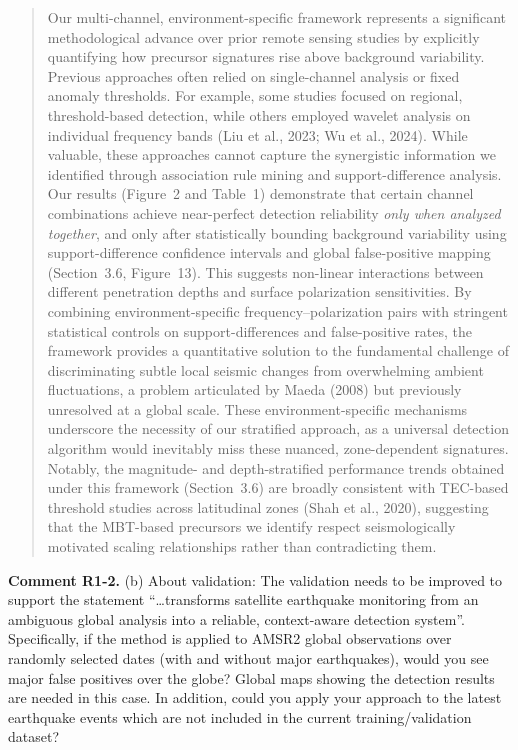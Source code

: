 \documentclass[12pt]{article}
\newcommand{\revcomment}[1]{\begingroup\color{commentcolor}#1\endgroup}
\begin{document}
{\begin{quote}
Our multi-channel, environment-specific framework represents a significant methodological advance over prior remote sensing studies by explicitly quantifying how precursor signatures rise above background variability. Previous approaches often relied on single-channel analysis or fixed anomaly thresholds. For example, some studies focused on regional, threshold-based detection, while others employed wavelet analysis on individual frequency bands (Liu et al., 2023; Wu et al., 2024). While valuable, these approaches cannot capture the synergistic information we identified through association rule mining and support-difference analysis. Our results (Figure~2 and Table~1) demonstrate that certain channel combinations achieve near-perfect detection reliability \emph{only when analyzed together}, and only after statistically bounding background variability using support-difference confidence intervals and global false-positive mapping (Section~3.6, Figure~13). This suggests non-linear interactions between different penetration depths and surface polarization sensitivities. By combining environment-specific frequency--polarization pairs with stringent statistical controls on support-differences and false-positive rates, the framework provides a quantitative solution to the fundamental challenge of discriminating subtle local seismic changes from overwhelming ambient fluctuations, a problem articulated by Maeda (2008) but previously unresolved at a global scale. These environment-specific mechanisms underscore the necessity of our stratified approach, as a universal detection algorithm would inevitably miss these nuanced, zone-dependent signatures. Notably, the magnitude- and depth-stratified performance trends obtained under this framework (Section~3.6) are broadly consistent with TEC-based threshold studies across latitudinal zones (Shah et al., 2020), suggesting that the MBT-based precursors we identify respect seismologically motivated scaling relationships rather than contradicting them.
\end{quote}
}

\bigskip

\revcomment{%
\textbf{Comment R1-2.} (b) About validation: The validation needs to be improved to support the statement ``\dots transforms satellite earthquake monitoring from an ambiguous global analysis into a reliable, context-aware detection system''. Specifically, if the method is applied to AMSR2 global observations over randomly selected dates (with and without major earthquakes), would you see major false positives over the globe? Global maps showing the detection results are needed in this case. In addition, could you apply your approach to the latest earthquake events which are not included in the current training/validation dataset?
}
\end{document}
